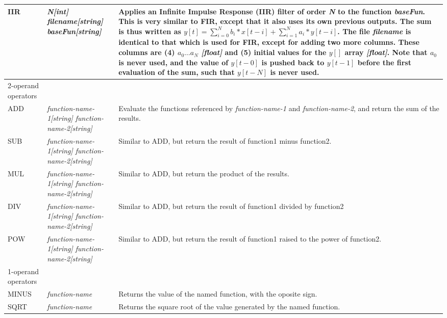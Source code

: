 \documentclass[a4paper,11pt]{report}
\begin{document}
\begin{center}
\begin{longtable}{|p{2.25cm} | p{4cm} p{9.5cm}|}
  IIR        & \emph{N[int] filename[string] baseFun[string]} &
  Applies an Infinite Impulse Response (IIR) filter of order \emph{N} to the function \emph{baseFun}.
  This is very similar to FIR, except that it also uses its own previous outputs.
  The sum is thus written as $y[t] = \sum_{i=0}^N b_i*x[t-i] + \sum_{i=1}^N a_i*y[t-i]$.
  The file \emph{filename} is identical to that which is used for FIR, except for adding two more columns.
  These columns are (4) $a_0\ldots a_N$ \emph{[float]} and (5) initial values for the $y[]$ array \emph{[float]}.
  Note that $a_0$ is never used, and the value of $y[t-0]$ is pushed back to $y[t-1]$ before the first evaluation of the sum, such that $y[t-N]$ is never used.\\

  \hline
  \rowcolor{blue!15}
  2-operand operators & & \\*

  ADD        & \emph{function-name-1[string] function-name-2[string]} &
  Evaluate the functions referenced by \emph{function-name-1} and \emph{function-name-2}, and return the sum of the results.\\*

  SUB        & \emph{function-name-1[string] function-name-2[string]} &
  Similar to ADD, but return the result of function1 minus function2.\\*
  
  MUL        & \emph{function-name-1[string] function-name-2[string]} & 
  Similar to ADD, but return the product of the results. \\*

  DIV        & \emph{function-name-1[string] function-name-2[string]} & 
  Similar to ADD, but return the result of function1 divided by function2\\*
  
  POW        & \emph{function-name-1[string] function-name-2[string]} & 
  Similar to ADD, but return the result of function1 raised to the power of function2.\\
  
  \hline
  \rowcolor{blue!15}
  1-operand operators & & \\*

  MINUS      & \emph{function-name} &
  Returns the value of the named function, with the oposite sign. \\*

  SQRT       & \emph{function-name} & 
  Returns the square root of the value generated by the named function. \\*
  

\end{longtable}
\end{center}
\end{document}
